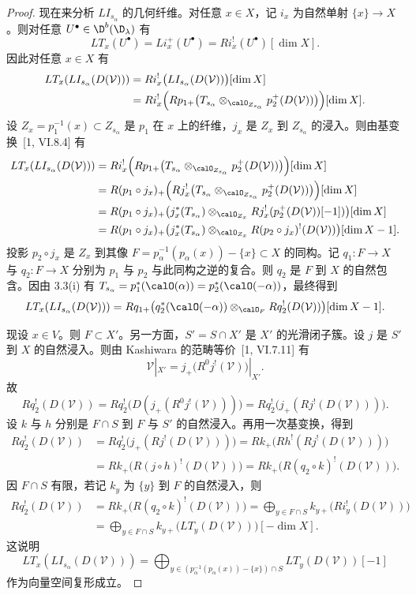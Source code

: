 \begin{proof}
现在来分析 $LI_{s_\alpha}$ 的几何纤维。对任意 $x\in X$，记 $i_x$ 为自然单射 $\{x\}\to X$。则对任意 $U^\bullet\in\D^b(\D_\lambda)$ 有
$$LT_x(U^\bullet)=Li_x^+(U^\bullet)=Ri_x^!(U^\bullet)[\dim X].$$
因此对任意 $x\in X$ 有
\begin{align*}
LT_x(LI_{s_\alpha}(D(\mathcal{V})))&=Ri_x^!\bigl(LI_{s_\alpha}(D(\mathcal{V}))\bigr)[\dim X]\\
&=Ri_x^!\Bigl(Rp_{1+}\bigl(T_{s_\alpha}\otimes_{\calO_{Z_{s_\alpha}}}p_2^+(D(\mathcal{V}))\bigr)\Bigr)[\dim X].
\end{align*}
设 $Z_x=p_1^{-1}(x)\subset Z_{s_\alpha}$ 是 $p_1$ 在 $x$ 上的纤维，$j_x$ 是 $Z_x$ 到 $Z_{s_\alpha}$ 的浸入。则由基变换~[1, VI.8.4] 有
{\small
\begin{align*}
LT_x(LI_{s_\alpha}(D(\mathcal{V})))&=Ri_x^!\Bigl(Rp_{1+}\bigl(T_{s_\alpha}\otimes_{\calO_{Z_{s_\alpha}}}p_2^+(D(\mathcal{V}))\bigr)\Bigr)[\dim X]\\
&=R(p_1\circ j_x)_+\Bigl(Rj_x^!\bigl(T_{s_\alpha}\otimes_{\calO_{Z_{s_\alpha}}}p_2^+(D(\mathcal{V}))\bigr)\Bigr)[\dim X]\\
&=R(p_1\circ j_x)_+\bigl(j_x^*(T_{s_\alpha})\otimes_{\calO_{Z_x}}Rj_x^!(p_2^+(D(\mathcal{V}))[-1])\bigr)[\dim X]\\
&=R(p_1\circ j_x)_+\bigl(j_x^*(T_{s_\alpha})\otimes_{\calO_{Z_x}}R(p_2\circ j_x)^!(D(\mathcal{V}))\bigr)[\dim X-1].
\end{align*}}
投影 $p_2\circ j_x$ 是 $Z_x$ 到其像 $F=p_\alpha^{-1}(p_\alpha(x))-\{x\}\subset X$ 的同构。记 $q_1:F\to X$ 与 $q_2:F\to X$ 分别为 $p_1$ 与 $p_2$ 与此同构之逆的复合。则 $q_2$ 是 $F$ 到 $X$ 的自然包含。因由 3.3(i) 有 $T_{s_\alpha}=p_1^*(\calO(\alpha))=p_2^*(\calO(-\alpha))$，最终得到
$$LT_x(LI_{s_\alpha}(D(\mathcal{V})))=Rq_{1+}\bigl(q_2^*(\calO(-\alpha))\otimes_{\calO_F}Rq_2^!(D(\mathcal{V}))\bigr)[\dim X-1].$$

现设 $x\in V$。则 $F\subset X'$。另一方面，$S'=S\cap X'$ 是 $X'$ 的光滑闭子簇。设 $j$ 是 $S'$ 到 $X$ 的自然浸入。则由 Kashiwara 的范畴等价~[1, VI.7.11] 有
$$\mathcal{V}|_{X'}=j_+\bigl(R^0j^!(\mathcal{V})\bigr)|_{X'}.$$
故
$$Rq_2^!(D(\mathcal{V}))=Rq_2^!\bigl(D(j_+(R^0j^!(\mathcal{V})))\bigr)=Rq_2^!\bigl(j_+(Rj^!(D(\mathcal{V})))\bigr).$$
设 $k$ 与 $h$ 分别是 $F\cap S$ 到 $F$ 与 $S'$ 的自然浸入。再用一次基变换，得到
\begin{align*}
Rq_2^!(D(\mathcal{V}))&=Rq_2^!\bigl(j_+(Rj^!(D(\mathcal{V})))\bigr)=Rk_+\bigl(Rh^!(Rj^!(D(\mathcal{V})))\bigr)\\
&=Rk_+\bigl(R(j\circ h)^!(D(\mathcal{V}))\bigr)=Rk_+\bigl(R(q_2\circ k)^!(D(\mathcal{V}))\bigr).
\end{align*}
因 $F\cap S$ 有限，若记 $k_y$ 为 $\{y\}$ 到 $F$ 的自然浸入，则
\begin{align*}
Rq_2^!(D(\mathcal{V}))&=Rk_+\bigl(R(q_2\circ k)^!(D(\mathcal{V}))\bigr)=\bigoplus_{y\in F\cap S}k_{y+}\bigl(Ri_y^!(D(\mathcal{V}))\bigr)\\
&=\bigoplus_{y\in F\cap S}k_{y+}\bigl(LT_y(D(\mathcal{V}))\bigr)[-\dim X].
\end{align*}
这说明
$$LT_x(LI_{s_\alpha}(D(\mathcal{V})))=\bigoplus_{y\in(p_\alpha^{-1}(p_\alpha(x))-\{x\})\cap S}LT_y(D(\mathcal{V}))[-1]$$
作为向量空间复形成立。


\end{proof}
